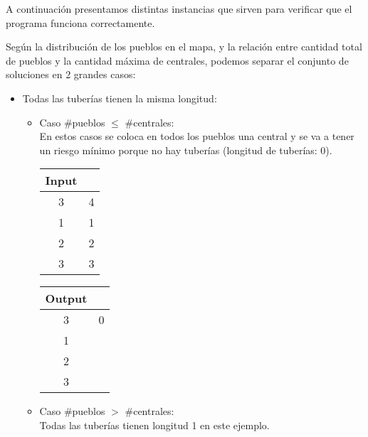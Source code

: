 \documentclass[11pt, a4paper, twoside]{article}
\begin{document}
{}
A continuación presentamos distintas instancias que sirven para 
verificar que el programa funciona correctamente.

Según la distribución de los pueblos en el mapa, y la relación entre cantidad total de pueblos y la cantidad 
máxima de centrales, podemos separar el conjunto de soluciones en 2 grandes casos: 

\begin{itemize}
	\item Todas las tuberías tienen la misma longitud: 
			\begin{itemize}
				\item Caso \#pueblos $\le$ \#centrales: \\
					En estos casos se coloca en todos los pueblos una central y se va a tener un riesgo mínimo 
					porque no hay tuberías (longitud de tuberías: 0). \\
					
					 \begin{minipage}{0.2\textwidth}
						\begin{tabular}{cc}
						   Input \\
						   \hline
						   3 & 4 \\
						   1 & 1 \\
						   2 & 2 \\
						   3 & 3 \\
						\end{tabular}
					\end{minipage} 
					\begin{minipage}{0.2\textwidth}
						\begin{tabular}{cc}
						   Output \\
						   \hline
						   3 & 0 \\
						   1 &  \\
						   2 &  \\
						   3 &  \\
						\end{tabular}
					\end{minipage} 
					
				\item Caso \#pueblos  $>$ \#centrales: \\
					Todas las tuberías tienen longitud 1 en este ejemplo. \\
					

\end{itemize}
\end{itemize}
\end{document}
